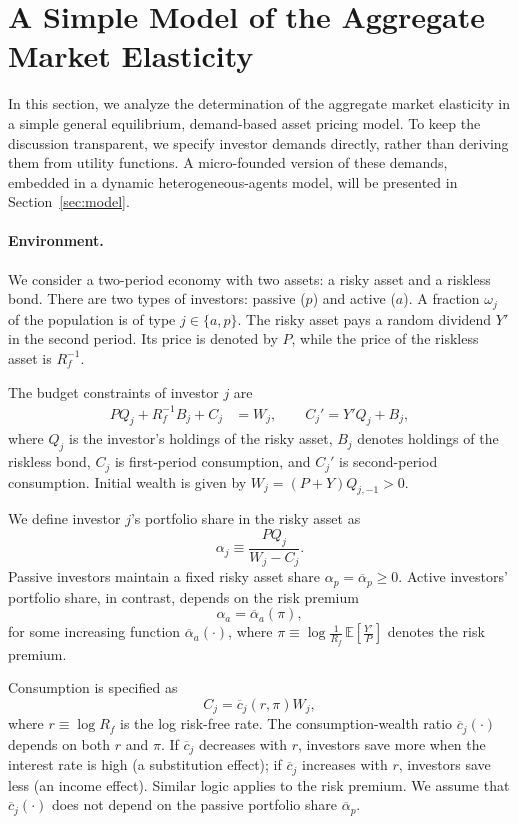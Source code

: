 \section{A Simple Model of the Aggregate Market Elasticity}\label{sec:simple}

In this section, we analyze the determination of the aggregate market elasticity in a simple general equilibrium, demand-based asset pricing model.
To keep the discussion transparent, we specify investor demands directly, rather than deriving them from utility functions.
A micro-founded version of these demands, embedded in a dynamic heterogeneous-agents model, will be presented in Section~\ref{sec:model}.

\paragraph{Environment.}
We consider a two-period economy with two assets: a risky asset and a riskless bond.
There are two types of investors: passive ($p$) and active ($a$).
A fraction $\omega_j$ of the population is of type $j \in \{a,p\}$.
The risky asset pays a random dividend $Y'$ in the second period.
Its price is denoted by $P$, while the price of the riskless asset is $R_f^{-1}$.

The budget constraints of investor $j$ are
\begin{align*}
    P Q_j + R_f^{-1} B_j + C_j &= W_j, 
    \qquad 
    C_j' = Y' Q_j + B_j,
\end{align*}
where $Q_j$ is the investor’s holdings of the risky asset, $B_j$ denotes holdings of the riskless bond, $C_j$ is first-period consumption, and $C_j'$ is second-period consumption.
Initial wealth is given by
$ W_j = (P+Y) Q_{j,-1} > 0. $

We define investor $j$’s portfolio share in the risky asset as
\[
    \alpha_j \equiv \frac{P Q_j}{W_j - C_j}.
\] 
Passive investors maintain a fixed risky asset share $\alpha_p = \overline{\alpha}_p \geq 0$.
Active investors’ portfolio share, in contrast, depends on the risk premium
\[
    \alpha_a = \overline{\alpha}_a(\pi),
\]
for some increasing function $\overline{\alpha}_a(\cdot)$, where $\pi \equiv \log \frac{1}{R_f}\,\mathbb{E}\!\left[\frac{Y'}{P}\right]$ denotes the risk premium.

Consumption is specified as
\[
    C_j = \overline{c}_{j}(r,\pi) W_j,
\]
where $r \equiv \log R_f$ is the log risk-free rate.
The consumption-wealth ratio $\overline{c}_j(\cdot)$ depends on both $r$ and $\pi$.
If $\overline{c}_j$ decreases with $r$, investors save more when the interest rate is high (a substitution effect); if $\overline{c}_j$ increases with $r$, investors save less (an income effect).
Similar logic applies to the risk premium.
We assume that $\overline{c}_j(\cdot)$ does not depend on the passive portfolio share $\overline{\alpha}_p$.

